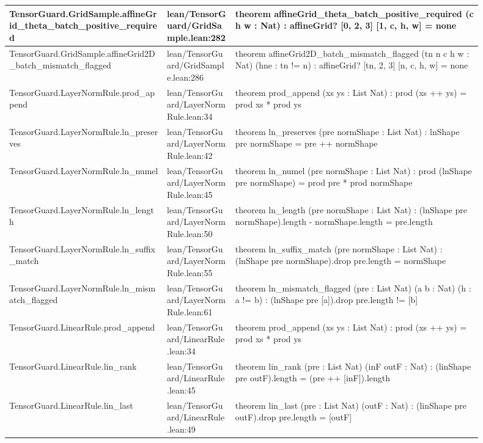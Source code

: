 \documentclass[10pt]{article}
\begin{document}
\begin{longtable}{|p{0.30\linewidth}|p{0.13\linewidth}|p{0.47\linewidth}|}
\hline
TensorGuard.GridSample.affineGrid\_theta\_batch\_positive\_required & lean/TensorGuard/GridSample.lean:282 & theorem affineGrid\_theta\_batch\_positive\_required (c h w : Nat) : affineGrid? [0, 2, 3] [1, c, h, w] = none \\
\hline
TensorGuard.GridSample.affineGrid2D\_batch\_mismatch\_flagged & lean/TensorGuard/GridSample.lean:286 & theorem affineGrid2D\_batch\_mismatch\_flagged (tn n c h w : Nat) (hne : tn != n) : affineGrid? [tn, 2, 3] [n, c, h, w] = none \\
\hline
TensorGuard.LayerNormRule.prod\_append & lean/TensorGuard/LayerNormRule.lean:34 & theorem prod\_append (xs ys : List Nat) : prod (xs ++ ys) = prod xs * prod ys \\
\hline
TensorGuard.LayerNormRule.ln\_preserves & lean/TensorGuard/LayerNormRule.lean:42 & theorem ln\_preserves (pre normShape : List Nat) : lnShape pre normShape = pre ++ normShape \\
\hline
TensorGuard.LayerNormRule.ln\_numel & lean/TensorGuard/LayerNormRule.lean:45 & theorem ln\_numel (pre normShape : List Nat) : prod (lnShape pre normShape) = prod pre * prod normShape \\
\hline
TensorGuard.LayerNormRule.ln\_length & lean/TensorGuard/LayerNormRule.lean:50 & theorem ln\_length (pre normShape : List Nat) : (lnShape pre normShape).length - normShape.length = pre.length \\
\hline
TensorGuard.LayerNormRule.ln\_suffix\_match & lean/TensorGuard/LayerNormRule.lean:55 & theorem ln\_suffix\_match (pre normShape : List Nat) : (lnShape pre normShape).drop pre.length = normShape \\
\hline
TensorGuard.LayerNormRule.ln\_mismatch\_flagged & lean/TensorGuard/LayerNormRule.lean:61 & theorem ln\_mismatch\_flagged (pre : List Nat) (a b : Nat) (h : a != b) : (lnShape pre [a]).drop pre.length != [b] \\
\hline
TensorGuard.LinearRule.prod\_append & lean/TensorGuard/LinearRule.lean:34 & theorem prod\_append (xs ys : List Nat) : prod (xs ++ ys) = prod xs * prod ys \\
\hline
TensorGuard.LinearRule.lin\_rank & lean/TensorGuard/LinearRule.lean:45 & theorem lin\_rank (pre : List Nat) (inF outF : Nat) : (linShape pre outF).length = (pre ++ [inF]).length \\
\hline
TensorGuard.LinearRule.lin\_last & lean/TensorGuard/LinearRule.lean:49 & theorem lin\_last (pre : List Nat) (outF : Nat) : (linShape pre outF).drop pre.length = [outF] \\

\end{longtable}
\end{document}

